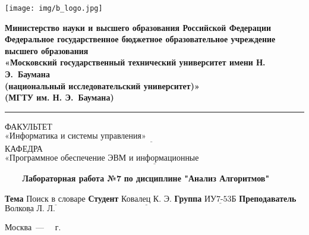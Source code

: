\documentclass[a4paper,14pt, unknownkeysallowed]{extreport}
\begin{document}
\begin{titlepage}
	\fontsize{12pt}{12pt}\selectfont
	\noindent \begin{minipage}{0.15\textwidth}
		\texttt{[image: img/b\_logo.jpg]}
	\end{minipage}
	\noindent\begin{minipage}{0.9\textwidth}\centering
		\textbf{Министерство науки и высшего образования Российской Федерации}\\
		\textbf{Федеральное государственное бюджетное образовательное учреждение высшего образования}\\
		\textbf{«Московский государственный технический университет имени Н. Э.~Баумана}\\
		\textbf{(национальный исследовательский университет)»}\\
		\textbf{(МГТУ им. Н. Э.~Баумана)}
	\end{minipage}
	
	\noindent\rule{18cm}{3pt}
	\newline\newline
	\noindent ФАКУЛЬТЕТ $\underline{\text{«Информатика и системы управления»~~~~~~~~~~~~~~~~~~~~~~~~~~~~~~~~~~~~~~~~~~~~~~~~~~~~~~~}}$ \newline\newline
	\noindent КАФЕДРА $\underline{\text{«Программное обеспечение ЭВМ и информационные технологии»~~~~~~~~~~~~~~~~~~~~~~~}}$\newline\newline\newline\newline\newline\newline\newline
	
	
	\begin{center}
		\noindent\begin{minipage}{1.3\textwidth}\centering
		\Large\textbf{   ~~~ Лабораторная работа №7}\newline
		\textbf{по дисциплине "Анализ Алгоритмов"}\newline\newline\newline
		\end{minipage}
	\end{center}
	
	\noindent\textbf{Тема} 			$\underline{\text{Поиск в словаре}}$\newline\newline
	\noindent\textbf{Студент} 		$\underline{\text{Ковалец К. Э.}}$\newline\newline
	\noindent\textbf{Группа} 		$\underline{\text{ИУ7-53Б}}$\newline\newline
	\noindent\textbf{Преподаватель} $\underline{\text{Волкова Л. Л.}}$\newline
	
	\begin{center}
		\vfill
		Москва~---~\the\year
		~г.
	\end{center}
	\restoregeometry
\end{titlepage}
\end{document}
